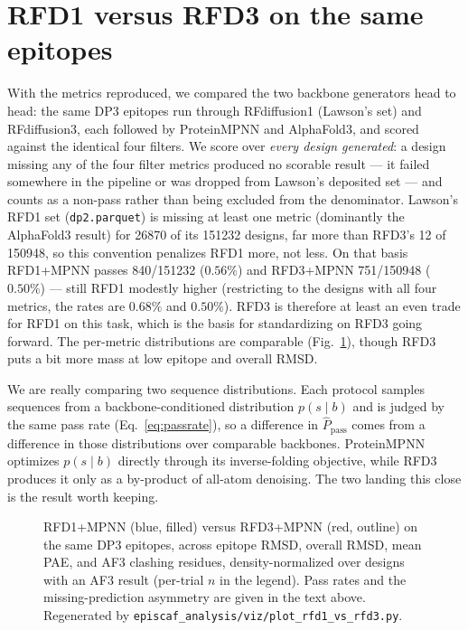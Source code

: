 \section{RFD1 versus RFD3 on the same epitopes}\label{sec:rfd}
With the metrics reproduced, we compared the two backbone generators head to head: the same
DP3 epitopes run through RFdiffusion1 (Lawson's set) and RFdiffusion3, each followed by
ProteinMPNN and AlphaFold3, and scored against the identical four filters. We score over
\emph{every design generated}: a design missing any of the four filter metrics produced no
scorable result --- it failed somewhere in the pipeline or was dropped from Lawson's deposited
set --- and counts as a non-pass rather than being excluded from the denominator. Lawson's RFD1
set (\texttt{dp2.parquet}) is missing at least one metric (dominantly the AlphaFold3 result)
for \num{26870} of its \num{151232} designs, far more than RFD3's \num{12} of \num{150948}, so
this convention penalizes RFD1 more, not less. On that basis RFD1+MPNN passes
\num{840}/\num{151232} ($0.56\%$) and RFD3+MPNN \num{751}/\num{150948} ($0.50\%$) --- still RFD1
modestly higher (restricting to the designs with all four metrics, the rates are $0.68\%$ and
$0.50\%$). RFD3 is therefore at least an even trade for RFD1 on this task, which is the basis
for standardizing on RFD3 going forward.
The per-metric distributions are comparable (Fig.~\ref{fig:rfd}), though RFD3 puts a bit more
mass at low epitope and overall RMSD.

We are really comparing two sequence distributions. Each protocol samples sequences from a
backbone-conditioned distribution $p(s\mid b)$ and is judged by the same pass rate
(Eq.~\ref{eq:passrate}), so a difference in $\hat P_{\text{pass}}$ comes from a difference in
those distributions over comparable backbones. ProteinMPNN optimizes $p(s\mid b)$ directly
through its inverse-folding objective, while RFD3 produces it only as a by-product of all-atom
denoising. The two landing this close is the result worth keeping.

\begin{figure}[h]\centering
{}
\caption{RFD1+MPNN (blue, filled) versus RFD3+MPNN (red, outline) on the same DP3 epitopes,
across epitope RMSD, overall RMSD, mean PAE, and AF3 clashing residues, density-normalized
over designs with an AF3 result (per-trial $n$ in the legend). Pass rates and the
missing-prediction asymmetry are given in the text above. Regenerated by
\texttt{episcaf\_analysis/viz/plot\_rfd1\_vs\_rfd3.py}.}
\label{fig:rfd}
\end{figure}

